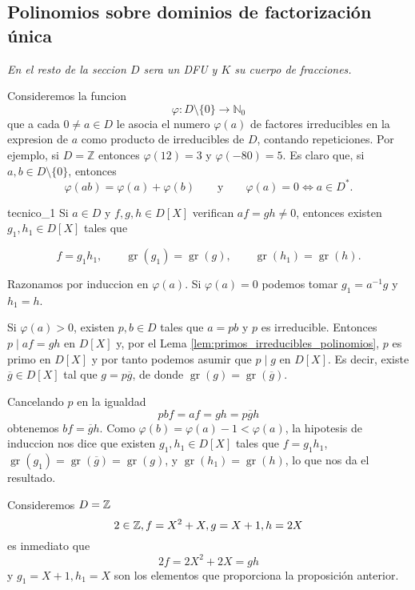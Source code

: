 \clearpage
\subsection{Polinomios sobre dominios de factorización única}

\emph{En el resto de la seccion $D$ sera un DFU y $K$ su cuerpo de fracciones.}

Consideremos la funcion
\[
\varphi:D\setminus\{0\}\to\mathbb{N}_{0}
\]
que a cada $0\neq a\in D$ le asocia el numero $\varphi(a)$ de factores irreducibles en la expresion de $a$ como producto de irreducibles de $D$, contando repeticiones. Por ejemplo, si $D=\mathbb{Z}$ entonces $\varphi(12)=3$ y $\varphi(-80)=5$. Es claro que, si $a,b\in D\setminus\{0\}$, entonces
\[
\varphi(ab)=\varphi(a)+\varphi(b)\qquad\text{y}\qquad\varphi(a)=0\Leftrightarrow a \in D^{*}.
\]

\begin{lemma}{}{tecnico_1}
Si $a\in D$ y $f,g,h\in D[X]$ verifican $af=gh\neq 0$, entonces existen $g_{1},h_{1}\in D[X]$ tales que

\[f=g_{1}h_{1},\qquad\operatorname{gr}(g_{1})=\operatorname{gr}(g),\qquad\operatorname{gr}(h _{1})=\operatorname{gr}(h).\]
\end{lemma}

\begin{proofbox}
Razonamos por induccion en $\varphi(a)$. Si $\varphi(a)=0$ podemos tomar $g_{1}=a^{-1}g$ y $h_{1}=h$.

Si $\varphi(a)>0$, existen $p,b\in D$ tales que $a=pb$ y $p$ es irreducible. Entonces $p \mid af=gh$ en $D[X]$ y, por el Lema \ref{lem:primos_irreducibles_polinomios}, $p$ es primo en $D[X]$ y por tanto podemos asumir que $p\mid g$ en $D[X]$. Es decir, existe $\overline{g}\in D[X]$ tal que $g=p\overline{g}$, de donde $\operatorname{gr}(g)=\operatorname{gr}(\overline{g})$.

Cancelando $p$ en la igualdad
\[
pbf=af=gh=p\overline{g}h
\]
obtenemos $bf=\overline{g}h$. Como $\varphi(b)=\varphi(a)-1<\varphi(a)$, la hipotesis de induccion nos dice que existen $g_{1},h_{1}\in D[X]$ tales que $f=g_{1}h_{1}$, $\operatorname{gr}(g_{1})=\operatorname{gr}(\overline{g})=\operatorname{gr}(g)$, y $\operatorname{gr}(h_{1})=\operatorname{gr}(h)$, lo que nos da el resultado.
\end{proofbox}

\begin{example}{}{}
Consideremos \(D = \mathbb{Z}\)
\[
2 \in \mathbb{Z}, f = X^2 + X, g = X + 1, h = 2X
\]
es inmediato que
\[
2f = 2X^2 + 2X = gh
\]
y $g_1 = X + 1, h_1 = X$ son los elementos que proporciona la proposición anterior.
\end{example}

